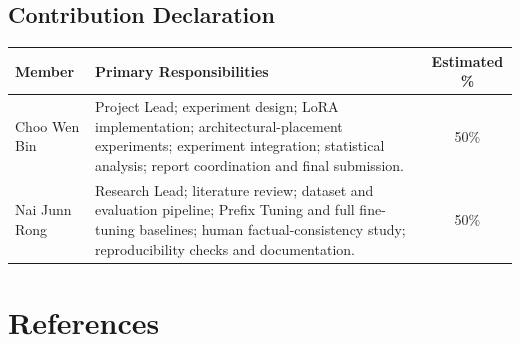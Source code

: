 \documentclass[11pt, letterpaper]{article}
\begin{document}
\subsection{Contribution Declaration}

\begin{center}
\begin{tabular}{p{3cm}p{9cm}c}
\toprule
\textbf{Member} & \textbf{Primary Responsibilities} & \textbf{Estimated \%} \\
\midrule

Choo Wen Bin &
Project Lead; experiment design; LoRA implementation; architectural-placement
experiments; experiment integration; statistical analysis; report coordination
and final submission. &
50\% \\

Nai Junn Rong &
Research Lead; literature review; dataset and evaluation pipeline; Prefix
Tuning and full fine-tuning baselines; human factual-consistency study;
reproducibility checks and documentation. &
50\% \\

\bottomrule
\end{tabular}
\end{center}

\section{References}
\end{document}

